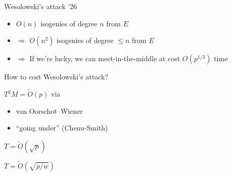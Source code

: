 \documentclass[aspectratio=169,12pt]{beamer}
\begin{document}

\begin{frame}{Wesolowski's attack '26}
  \large\centering

  \bigskip
  
  \begin{itemize}
    \setlength{\itemsep}{1em}
  \item $O(n)$ isogenies of degree $n$ from $E$
  \item $⇒$ $O(n^2)$ isogenies of degree $≤ n$ from $E$
  \item<2-> $⇒$ If we're lucky, we can meet-in-the-middle at cost
    $O(p^{1/3})$ time 
  \end{itemize}
\end{frame}


\begin{frame}{How to cost Wesolowski's attack?}
  \large
  \begin{description}
    \setlength{\itemsep}{2em}
  \item[Invariant:]
    $T^2M = \tilde{O}(p)$ via\\[1em]
    \begin{itemize}
    \item van Oorschot--Wiener
    \item ``going under'' (Chenu-Smith)
    \end{itemize}
  \item[At constant memory:] $T = \tilde{O}(\sqrt{p})$
  \item[With memory bound $w$:] $T = \tilde{O}(\sqrt{p/w})$
  \end{description}
\end{frame}

\end{document}
